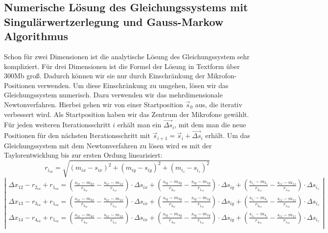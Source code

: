 \subsection{Numerische Lösung des Gleichungssystems mit Singulärwertzerlegung und Gauss-Markow Algorithmus}
Schon für zwei Dimensionen ist die analytische Lösung des Gleichungssystem sehr kompliziert. Für drei Dimensionen ist die Formel der Lösung in Textform über 300Mb groß. Dadurch können wir sie nur durch Einschränkung der Mikrofon-Positionen verwenden. Um diese Einschränkung zu umgehen, lösen wir das Gleichungssystem numerisch. Dazu verwenden wir das mehrdimensionale Newtonverfahren. Hierbei gehen wir von einer Startposition $\vec{s}_0$ aus, die iterativ verbessert wird. Als Startposition haben wir das Zentrum der Mikrofone gewählt.
Für jeden weiteren Iterationsschritt $i$ erhält man ein $\vec{\Delta{s}}_i$, mit dem man die neue Positionen für den nächsten Iterationsschritt mit $\vec{s}_{i + 1} = \vec{s}_i + \vec{\Delta{s}}_i$ erhält.
Um das Gleichungssystem mit dem Newtonverfahren zu lösen wird es mit der Taylorentwicklung bis zur ersten Ordung linearisiert:
$$r_{i_{ca}} = \sqrt{(m_{ix} - s_{ix})^2 + (m_{iy} - s_{iy})^2 + (m_{i_z} - s_{i_z})^2}$$
$$\left|\begin{array}{c}
\Delta{x_{12}} - r_{2_{ca}} + r_{1_{ca}} = \left(\frac{s_{ix} - m_{2x}}{r_{2_{ca}}} - \frac{s_{ix} - m_{1x}}{r_{1_{ca}}} \right) \cdot {\Delta{s}}_{ix} + \left(\frac{s_{iy} - m_{2y}}{r_{2_{ca}}} - \frac{s_{iy} - m_{1y}}{r_{1_{ca}}} \right) \cdot {\Delta{s}}_{iy} + \left(\frac{s_{i_z} - m_{2_z}}{r_{2_{ca}}} - \frac{s_{iz} - m_{1z}}{r_{1_{ca}}} \right) \cdot {\Delta{s}}_{i_z} \\
\Delta{x_{13}} - r_{3_{ca}} + r_{1_{ca}} = \left(\frac{s_{ix} - m_{3x}}{r_{3_{ca}}} - \frac{s_{ix} - m_{1x}}{r_{1_{ca}}} \right) \cdot {\Delta{s}}_{ix} + \left(\frac{s_{iy} - m_{3y}}{r_{3_{ca}}} - \frac{s_{iy} - m_{1y}}{r_{1_{ca}}} \right) \cdot {\Delta{s}}_{iy} + \left(\frac{s_{i_z} - m_{3_z}}{r_{3_{ca}}} - \frac{s_{iz} - m_{1z}}{r_{1_{ca}}} \right) \cdot {\Delta{s}}_{i_z} \\
\Delta{x_{14}} - r_{4_{ca}} + r_{1_{ca}} = \left(\frac{s_{ix} - m_{4x}}{r_{4_{ca}}} - \frac{s_{ix} - m_{1x}}{r_{1_{ca}}} \right) \cdot {\Delta{s}}_{ix} + \left(\frac{s_{iy} - m_{4y}}{r_{4_{ca}}} - \frac{s_{iy} - m_{1y}}{r_{1_{ca}}} \right) \cdot {\Delta{s}}_{iy} + \left(\frac{s_{i_z} - m_{4_z}}{r_{4_{ca}}} - \frac{s_{iz} - m_{1z}}{r_{1_{ca}}} \right) \cdot {\Delta{s}}_{i_z} \\
\end{array}\right|$$
